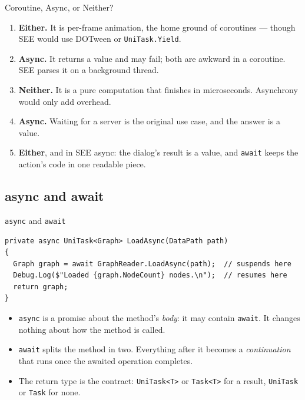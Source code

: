 \begin{solutionframe}{Coroutine, Async, or Neither?}
  \begin{enumerate}
    \item \textbf{Either.} It is per-frame animation, the home ground of
      coroutines --- though SEE would use DOTween or \texttt{UniTask.Yield}.
    \item \textbf{Async.} It returns a value and may fail; both are awkward in
      a coroutine. SEE parses it on a background thread.
    \item \textbf{Neither.} It is a pure computation that finishes in
      microseconds. Asynchrony would only add overhead.
    \item \textbf{Async.} Waiting for a server is the original use case, and
      the answer is a value.
    \item \textbf{Either}, and in SEE async: the dialog's result is a value,
      and \texttt{await} keeps the action's code in one readable piece.
  \end{enumerate}
  \vspace{1ex}

\end{solutionframe}

\subsection{async and await}

\begin{frame}[fragile]{\texttt{async} and \texttt{await}}
  \begin{lstlisting}[basicstyle=\scriptsize\ttfamily]
private async UniTask<Graph> LoadAsync(DataPath path)
{
  Graph graph = await GraphReader.LoadAsync(path);  // suspends here
  Debug.Log($"Loaded {graph.NodeCount} nodes.\n");  // resumes here
  return graph;
}
  \end{lstlisting}
  \vspace{1ex}

  \begin{itemize}
    \item \texttt{async} is a promise about the method's \emph{body}: it may
      contain \texttt{await}. It changes nothing about how the method is
      called.
    \item \texttt{await} splits the method in two. Everything after it becomes
      a \emph{continuation} that runs once the awaited operation completes.
    \item The return type is the contract: \texttt{UniTask<T>} or
      \texttt{Task<T>} for a result, \texttt{UniTask} or \texttt{Task} for
      none.
  \end{itemize}
  \vspace{1ex}

\end{frame}

